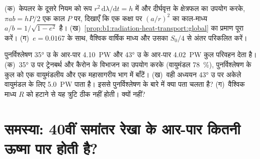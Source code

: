 \begin{exercise}[$\star\star\star$]\label{exo:b1:radiation-heat-transport:11}
(क)~केपलर के दूसरे नियम को रूप $r^2\,\mathrm d\lambda/\mathrm dt = h$ में और दीर्घवृत्त के क्षेत्रफल का उपयोग करके, $\pi a b = hP/2$ एक काल $P$ पर, दिखाएँ कि एक कक्षा पर $(a/r)^2$ का काल-माध्य $a/b = 1/\sqrt{1 - e^2}$ है। (ख)~\cref{prop:b1:radiation-heat-transport:global} का प्रमाण पूरा करें। (ग)~$e = 0.0167$ के साथ, वैश्विक वार्षिक माध्य और उसका $S_0/4$ से अंतर परिकलित करें।
\end{exercise}

\begin{exercise}[$\star\star\star$]\label{exo:b1:radiation-heat-transport:12}
पुनर्विश्लेषण \ang{35} उ के आर-पार \qty{4.10}{PW} और \ang{43} उ के आर-पार \qty{4.02}{PW} कुल परिवहन देता है। (क)~\ang{35} उ पर ट्रेनबर्थ और कैरोन के विभाजन का उपयोग करके (वायुमंडल \qty{78}{\percent}), पुनर्विश्लेषण के कुल को एक वायुमंडलीय और एक महासागरीय भाग में बाँटें। (ख)~वही अध्ययन \ang{43} उ पर अकेले वायुमंडल के लिए \qty{5.0}{PW} पाता है। इससे पुनर्विश्लेषण के बारे में क्या पता चलता है? (ग)~वैश्विक माध्य $R$ को हटाने से यह त्रुटि ठीक नहीं होती। क्यों नहीं?
\end{exercise}

\section{समस्या: 40वीं समांतर रेखा के आर-पार कितनी ऊष्मा पार होती है?}

